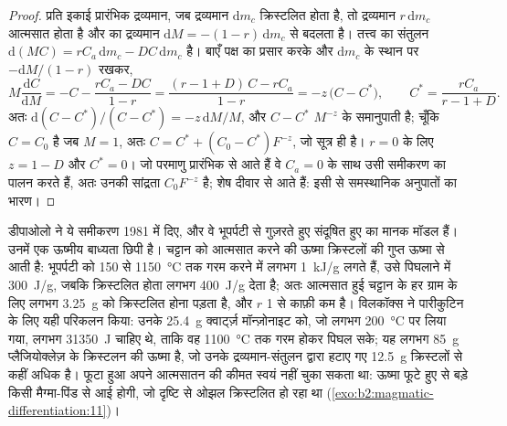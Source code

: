 \begin{proof}
प्रति इकाई प्रारंभिक द्रव्यमान, जब द्रव्यमान $\mathrm dm_c$ क्रिस्टलित होता है, तो द्रव्यमान
$r\,\mathrm dm_c$ आत्मसात होता है और  का द्रव्यमान $\mathrm dM =
-(1-r)\,\mathrm dm_c$ से बदलता है। तत्त्व का संतुलन $\mathrm d(MC) = rC_a\,\mathrm dm_c -
DC\,\mathrm dm_c$ है। बाएँ पक्ष का प्रसार करके और $\mathrm dm_c$ के स्थान पर
$-\mathrm dM/(1-r)$ रखकर,
\[
M\frac{\mathrm dC}{\mathrm dM} = -C - \frac{rC_a - DC}{1-r}
= \frac{(r - 1 + D)\,C - rC_a}{1 - r} = -z\,\bigl(C - C^*\bigr),
\qquad C^* = \frac{rC_a}{r - 1 + D}.
\]
अतः $\mathrm d(C - C^*)/(C - C^*) = -z\,\mathrm dM/M$, और $C - C^*$
$M^{-z}$ के समानुपाती है; चूँकि $C = C_0$ है जब $M = 1$, अतः $C = C^* + (C_0 - C^*)F^{-z}$, जो
सूत्र ही है। $r = 0$ के लिए $z = 1 - D$ और $C^* = 0$। जो परमाणु
प्रारंभिक  से आते हैं वे $C_a = 0$ के साथ उसी समीकरण का पालन करते हैं, अतः उनकी सांद्रता
$C_0F^{-z}$ है; शेष दीवार से आते हैं: इसी से समस्थानिक अनुपातों का भारण।
\end{proof}

डीपाओलो ने ये समीकरण 1981 में दिए, और वे भूपर्पटी से गुज़रते हुए संदूषित हुए  का
मानक मॉडल हैं। उनमें एक ऊष्मीय बाध्यता छिपी है। चट्टान को आत्मसात करने की
ऊष्मा क्रिस्टलों की गुप्त ऊष्मा से आती है: भूपर्पटी को
150 से \qty{1150}{\celsius} तक गरम करने में लगभग \qty{1}{kJ/g} लगते हैं, उसे पिघलाने में \qty{300}{J/g},
जबकि क्रिस्टलित होता  लगभग \qty{400}{J/g} देता है; अतः आत्मसात हुई चट्टान के हर ग्राम के लिए
लगभग \qty{3.25}{g}  को क्रिस्टलित होना पड़ता है, और $r$ 1 से काफ़ी कम है।
विलकॉक्स ने पारीकुटिन के लिए यही परिकलन किया: उनके \qty{25.4}{g} क्वार्ट्ज़
मॉन्ज़ोनाइट को, जो लगभग \qty{200}{\celsius} पर लिया गया, लगभग \qty{31350}{J} चाहिए थे, ताकि वह
\qty{1100}{\celsius} तक गरम होकर पिघल सके; यह लगभग
\qty{85}{g} प्लैजियोक्लेज़ के क्रिस्टलन की ऊष्मा है, जो उनके द्रव्यमान-संतुलन द्वारा हटाए गए \qty{12.5}{g} क्रिस्टलों से कहीं अधिक है।
फूटा हुआ  अपने आत्मसातन की कीमत स्वयं नहीं चुका सकता था:
ऊष्मा फूटे हुए  से बड़े किसी मैग्मा-पिंड से आई होगी,
जो दृष्टि से ओझल क्रिस्टलित हो रहा था (\cref{exo:b2:magmatic-differentiation:11})।

